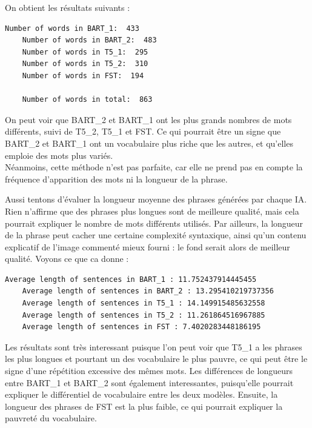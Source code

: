 \documentclass[conference]{IEEEtran}
\begin{document}
On obtient les résultats suivants : 

\vspace{5mm}

\begin{mdframed}
  \begin{lstlisting}[style=terminal]
    Number of words in BART_1:  433
    Number of words in BART_2:  483
    Number of words in T5_1:  295
    Number of words in T5_2:  310
    Number of words in FST:  194

    Number of words in total:  863
  \end{lstlisting}
\end{mdframed}

\vspace{5mm}

On peut voir que BART\_2 et BART\_1 ont les plus grands nombres de mots différents, suivi de T5\_2, T5\_1 et FST. Ce qui pourrait être un signe que BART\_2 et BART\_1 ont un vocabulaire plus riche que les autres, et qu'elles emploie des mots plus variés.\\

Néanmoins, cette méthode n'est pas parfaite, car elle ne prend pas en compte la fréquence d'apparition des mots ni la longueur de la phrase.

Aussi tentons d'évaluer la longueur moyenne des phrases générées par chaque IA. Rien n'affirme que des phrases plus longues sont de meilleure qualité, mais cela pourrait expliquer le nombre de mots différents utilisés. Par ailleurs, 
la longueur de la phrase peut cacher une certaine complexité syntaxique, ainsi qu'un contenu explicatif de l'image commenté mieux fourni : le fond serait alors de meilleur qualité. Voyons ce que ca donne : 

\vspace{5mm}

\begin{mdframed}
  \begin{lstlisting}[style=terminal]
    Average length of sentences in BART_1 : 11.752437914445455
    Average length of sentences in BART_2 : 13.295410219737356
    Average length of sentences in T5_1 : 14.149915485632558
    Average length of sentences in T5_2 : 11.261864516967885
    Average length of sentences in FST : 7.4020283448186195
  \end{lstlisting}
\end{mdframed}

\vspace{5mm}

Les résultats sont très interessant puisque l'on peut voir que T5\_1 a les phrases les plus longues et pourtant un des vocabulaire le plus pauvre, ce qui peut être le signe d'une répétition excessive des mêmes mots. 
Les différences de longueurs entre BART\_1 et BART\_2 sont également interessantes, puisqu'elle pourrait expliquer le différentiel de vocabulaire entre les deux modèles.
Ensuite, la longueur des phrases de FST est la plus faible, ce qui pourrait expliquer la pauvreté du vocabulaire.
\end{document}
